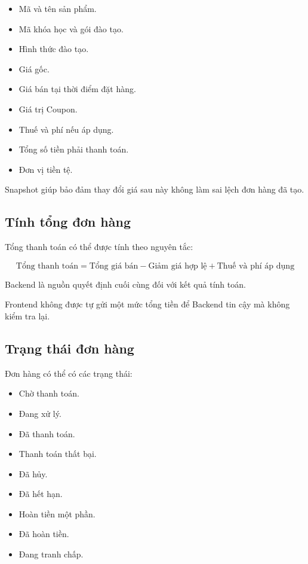 \documentclass[12pt,a4paper]{article}
\begin{document}
\begin{itemize}
    \item Mã và tên sản phẩm.
    \item Mã khóa học và gói đào tạo.
    \item Hình thức đào tạo.
    \item Giá gốc.
    \item Giá bán tại thời điểm đặt hàng.
    \item Giá trị Coupon.
    \item Thuế và phí nếu áp dụng.
    \item Tổng số tiền phải thanh toán.
    \item Đơn vị tiền tệ.
\end{itemize}

Snapshot giúp bảo đảm thay đổi giá sau này
không làm sai lệch đơn hàng đã tạo.

\subsection{Tính tổng đơn hàng}

Tổng thanh toán có thể được tính theo nguyên tắc:

\[
\text{Tổng thanh toán}
=
\text{Tổng giá bán}
-
\text{Giảm giá hợp lệ}
+
\text{Thuế và phí áp dụng}
\]

Backend là nguồn quyết định cuối cùng đối với kết quả tính toán.

Frontend không được tự gửi một mức tổng tiền để Backend tin cậy
mà không kiểm tra lại.

\subsection{Trạng thái đơn hàng}

Đơn hàng có thể có các trạng thái:

\begin{itemize}
    \item Chờ thanh toán.
    \item Đang xử lý.
    \item Đã thanh toán.
    \item Thanh toán thất bại.
    \item Đã hủy.
    \item Đã hết hạn.
    \item Hoàn tiền một phần.
    \item Đã hoàn tiền.
    \item Đang tranh chấp.
\end{itemize}
\end{document}
